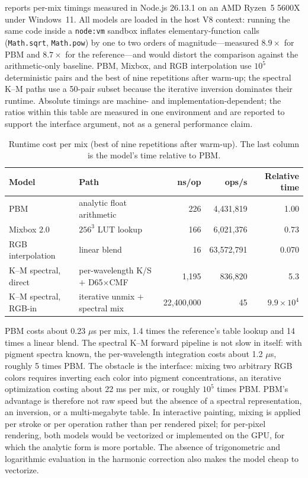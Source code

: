  reports per-mix timings measured in Node.js 26.13.1 on an AMD Ryzen~5 5600X under Windows~11. All models are loaded in the host V8 context: running the same code inside a \texttt{node:vm} sandbox inflates elementary-function calls (\texttt{Math.sqrt}, \texttt{Math.pow}) by one to two orders of magnitude---measured $8.9\times$ for PBM and $8.7\times$ for the reference---and would distort the comparison against the arithmetic-only baseline. PBM, Mixbox, and RGB interpolation use $10^{5}$ deterministic pairs and the best of nine repetitions after warm-up; the spectral K--M paths use a 50-pair subset because the iterative inversion dominates their runtime. Absolute timings are machine- and implementation-dependent; the ratios within this table are measured in one environment and are reported to support the interface argument, not as a general performance claim.

\begin{table}[t]
\centering
\small
\caption{Runtime cost per mix (best of nine repetitions after warm-up). The last column is the model's time relative to PBM.}
\label{tab:runtime}
\begin{tabular}{llrrr}
\toprule
Model & Path & ns/op & ops/s & Relative time \\
\midrule
PBM & analytic float arithmetic & 226 & 4{,}431,819 & 1.00 \\
Mixbox 2.0 & $256^{3}$ LUT lookup & 166 & 6{,}021,376 & 0.73 \\
RGB interpolation & linear blend & 16 & 63{,}572{,}791 & 0.070 \\
K--M spectral, direct & per-wavelength K/S $+$ D65$\times$CMF & 1{,}195 & 836,820 & 5.3 \\
K--M spectral, RGB-in & iterative unmix $+$ spectral mix & 22{,}400{,}000 & 45 & $9.9\times10^{4}$ \\
\bottomrule
\end{tabular}
\end{table}

PBM costs about 0.23 $\mu$s per mix, 1.4 times the reference's table lookup and 14 times a linear blend. The spectral K--M forward pipeline is not slow in itself: with pigment spectra known, the per-wavelength integration costs about 1.2 $\mu$s, roughly 5 times PBM. The obstacle is the interface: mixing two arbitrary RGB colors requires inverting each color into pigment concentrations, an iterative optimization costing about 22 ms per mix, or roughly $10^{5}$ times PBM. PBM's advantage is therefore not raw speed but the absence of a spectral representation, an inversion, or a multi-megabyte table. In interactive painting, mixing is applied per stroke or per operation rather than per rendered pixel; for per-pixel rendering, both models would be vectorized or implemented on the GPU, for which the analytic form is more portable. The absence of trigonometric and logarithmic evaluation in the harmonic correction also makes the model cheap to vectorize.

